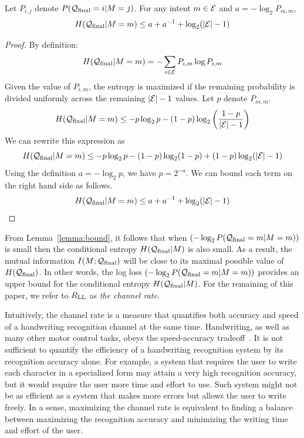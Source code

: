 \documentclass{sigchi}
\begin{document}
\begin{lemma}
\label{lemma:bound}
Let $P_{i,j}$ denote $P(\mathcal{Q}_{\mathrm{final}} = i | M = j)$. For any intent $m \in \mathcal{E}$ and $a = -\log_2 P_{m,m}$,  
\[ H(\mathcal{Q}_{\mathrm{final}} | M=m) \leq a + a^{-1} + \log_2
(|\mathcal{E}|-1) \]
\end{lemma}
\begin{proof}
By definition:
\[ H(\mathcal{Q}_{\mathrm{final}} | M=m) = -\displaystyle\sum_{i \in \mathcal{E}} P_{i,m} \log P_{i,m}\]
Given the value of $P_{i,m}$, the entropy is maximized if the
remaining probability is divided uniformly across the remaining $|\mathcal{E}|-1$
values. Let $p$ denote $P_{m,m}$.
\[
 H(\mathcal{Q}_{\mathrm{final}} | M=m) \leq -p \log_2 p - (1-p) \log_2 \left(\frac{1-p}{|\mathcal{E}|-1}\right)
\]
We can rewrite this expression as 
{
\small
\[
 H(\mathcal{Q}_{\mathrm{final}} | M=m) \leq -p \log_2 p - (1-p) \log_2 (1-p) +
 (1-p) \log_2 (|\mathcal{E}|-1)
\]
}
Using the definition $a = -\log_2 p$, we have $p = 2^{-a}$. We can
bound each term on the right hand side as follows. 
\[
 H(\mathcal{Q}_{\mathrm{final}} | M=m) \leq a + a^{-1} + \log_2 (|\mathcal{E}|-1)
\]
\end{proof}

From Lemma~\ref{lemma:bound}, it follows that when $(-\log_2
P(\mathcal{Q}_{\mathrm{final}} = m | M = m))$ is small then the conditional entropy
$H(\mathcal{Q}_{\mathrm{final}} | M)$ is also small. As a result, the mutual
information $I( M ; \mathcal{Q}_{\mathrm{final}})$ will be close to its maximal
possible value of $H(\mathcal{Q}_{\mathrm{final}})$. In other words, the log loss
$(-\log_2 P(\mathcal{Q}_{\mathrm{final}} = m | M = m))$ provides an upper bound for
the conditional entropy $H(\mathcal{Q}_{\mathrm{final}} | M)$. For the remaining
of this paper, we refer to $R_{\mathrm{LL}}$ as {\em the channel rate}.

Intuitively, the channel rate is a measure that quantifies both
accuracy and speed of a handwriting recognition channel at the same
time. Handwriting, as well as many other motor control tasks, obeys
the speed-accuracy tradeoff~\cite{Fitts1954}. It is not sufficient to
quantify the efficiency of a handwriting recognition system by its
recognition accuracy alone. For example, a system that requires the
user to write each character in a specialized form may attain a very
high recognition accuracy, but it would require the user more time and
effort to use. Such system might not be as efficient as a system that
makes more errors but allows the user to write freely. In a sense,
maximizing the channel rate is equivalent to finding a balance between
maximizing the recognition accuracy and minimizing the writing time
and effort of the user.
\end{document}
